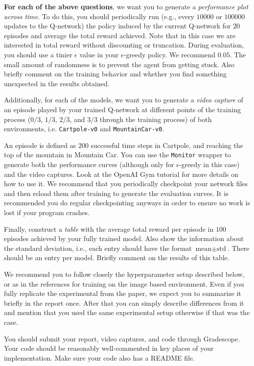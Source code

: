 \documentclass[12pt]{article}
\begin{document}
\textbf{For each of the above questions}, we want you to generate a \emph{performance plot across time}.  To do this, you should periodically run (e.g., every $10000$ or $100000$ updates to the Q-network) the policy induced by the current Q-network for $20$ episodes and average the total reward achieved. Note that in this case we are interested in total reward without discounting or truncation. During evaluation, you should use a tinier $\epsilon$ value in your $\epsilon$-greedy policy. We recommend $0.05$. The small amount of randomness is to prevent the agent from getting stuck.  Also briefly comment on the training behavior and whether you find something unexpected in the results obtained.

Additionally, for each of the models, we want you to generate a \emph{video capture} of an episode played by your trained Q-network at different points of the training process ($0/3$, $1/3$, $2/3$, and $3/3$ through the training process) of both environments, i.e. \texttt{Cartpole-v0} and \texttt{MountainCar-v0}. 

An episode is defined as $200$ successful time steps in Cartpole, and reaching the top of the mountain in Mountain Car. You can use the \texttt{Monitor} wrapper to generate both the performance curves (although only for $\epsilon$-greedy in this case) and the video captures. Look at the OpenAI Gym tutorial for more details on how to use it. We recommend that you periodically checkpoint your network files and then reload them after training to generate the evaluation curves. It is recommended you do regular checkpointing anyways in order to ensure no work is lost if your program crashes.

Finally, construct a \emph{table} with the average total reward per episode in $100$ episodes
achieved by your fully trained model. Also show the information about the standard deviation, i.e., 
each entry should have the format $\text{mean} \pm \text{std}$.
There should be an entry per model. Briefly comment on the results of this table.

We recommend you to follow closely the hyperparameter setup described below, or as in the references for training on the image based environment. Even if you fully replicate the experimental from the paper, we expect you to summarize it briefly in the report once. After that you can simply describe differences from it and mention that you used the same experimental setup otherwise if that was the case.

You should submit  your report, video captures, and code through Gradescope. Your code should be 
reasonably well-commented in key places of your implementation. Make sure your code also has a README file.
\end{document}
